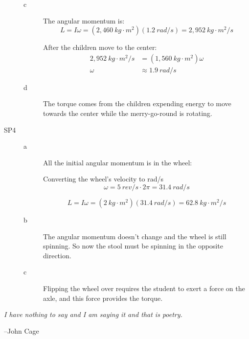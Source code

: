\documentclass{exam}
\begin{document}
\begin{description}
\begin{description}
\item[c]
The angular momentum is:
\[
  L = I \omega = (2,460 \ kg \cdot m^2)(1.2 \ rad/s) = 2,952 \ kg \cdot m^2/s
\]

After the children move to the center:
\begin{align*}
  2,952 \ kg \cdot m^2/s &= (1,560 \ kg \cdot m^2) \omega \\
  \omega &\approx 1.9 \ rad/s
\end{align*}

\item[d]

The torque comes from the children expending energy to move towards the center while the merry-go-round is rotating.

\end{description}

\item[SP4]

\begin{description}
\item[a]
All the initial angular momentum is in the wheel:

Converting the wheel's velocity to rad/s
\[
  \omega = 5 \ rev/s \cdot 2 \pi = 31.4 \ rad/s
\]

\[
  L = I \omega = (2 \ kg \cdot m^2)(31.4 \ rad/s) = 62.8 \ kg \cdot m^2/s
\]

\item[b]
The angular momentum doesn't change and the wheel is still spinning.  So now the stool must be spinning in the opposite direction.


\item[c]
Flipping the wheel over requires the student to exert a force on the axle, and this force provides the torque.

\end{description}

\end{description}

\fi


\vspace{2.5 in}

\ifprintanswers
\else
{\em I have nothing to say and I am saying it and that is poetry.}
\vspace{.2 cm}

\hspace{1 cm} --John Cage
\fi
\end{document}
